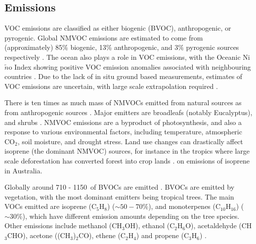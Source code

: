   
  \subsection{Emissions}
    \label{LR:VOCs:Emissions}
    
    VOC emissions are classified as either biogenic (BVOC), anthropogenic, or pyrogenic.
    Global NMVOC emissions are estimated to come from (approximately) 85\% biogenic, 13\% 
    anthropogenic, and 3\% pyrogenic sources respectively 
    \parencite{Kanakidou2005, Kefauver2014}.
    The ocean also plays a role in VOC emissions, with the Oceanic 
    Ni$\tilde{n}$o Index showing positive VOC emission anomalies associated 
    with neighbouring countries \parencite{Stavrakou2014}.
    Due to the lack of in situ ground based measurements, estimates of VOC 
    emissions are uncertain, with large scale extrapolation required 
    \parencite{Millet2006}.
    
    
    There is ten times as much mass of NMVOCs emitted from natural sources as 
    from anthropogenic sources \parencite{Guenther2006, Kanakidou2005, 
    Millet2006}.
    Major emitters are broadleafs (notably Eucalyptus), and shrubs \parencite{Guenther2006, Arneth2008, Niinemets2010, Monks2015}.
    NMVOC emissions are a byproduct of photosynthesis, and also a response to 
    various environmental factors, including temperature, atmospheric CO$_2$, 
    soil moisture, and drought stress.
    Land use changes can drastically affect isoprene (the dominant NMVOC) sources, for instance in the tropics where large scale deforestation has converted forest into crop lands \parencite{Kanakidou2005}.
    on emissions of isoprene in Australia.
    
    Globally around 710 - 1150\tgcpyr ~of BVOCs are emitted \parencite{Guenther1995, Lathiere2006, Guenther2012, Messina2016}.
    BVOCs are emitted by vegetation, with the most dominant emitters being tropical trees. 
    The main VOCs emitted are isoprene (C$_5$H$_8$) ($\sim50-70\%$), and monoterpenes (C$_10$H$_16$) ($\sim30\%$), which have different emission amounts depending on the tree species\parencite{Guenther2012, Sindelarova2014}. 
    Other emissions include methanol (CH$_3$OH), ethanol (C$_2$H$_6$O), acetaldehyde (CH$_3$CHO), acetone ((CH$_3$)$_2$CO), ethene (C$_2$H$_4$) and propene (C$_3$H$_6$) \parencite{Guenther2012}.
    

